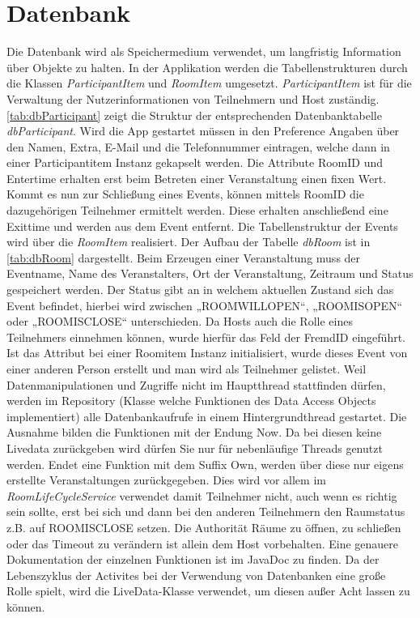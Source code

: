 \section{Datenbank}
\label{sec:Datenbank}
Die Datenbank wird als Speichermedium verwendet, um langfristig Information über Objekte zu halten. 
In der Applikation werden die Tabellenstrukturen durch die Klassen \textit{ParticipantItem} und \textit{RoomItem} umgesetzt. 
\textit{ParticipantItem} ist für die Verwaltung der Nutzerinformationen von Teilnehmern und Host zuständig.
 \cref{tab:dbParticipant} zeigt die Struktur der entsprechenden Datenbanktabelle \textit{dbParticipant}.
 Wird die App gestartet müssen in den Preference Angaben über den Namen, Extra, E-Mail und die Telefonnummer eintragen, welche dann in einer Participantitem Instanz gekapselt werden. 
Die Attribute RoomID und Entertime erhalten erst beim Betreten einer Veranstaltung einen fixen Wert. Kommt es nun zur Schließung eines Events, können mittels RoomID die dazugehörigen Teilnehmer ermittelt werden. 
Diese erhalten anschließend eine Exittime und werden aus dem Event entfernt.
Die Tabellenstruktur der Events wird über die \textit{RoomItem} realisiert. Der Aufbau der Tabelle \textit{dbRoom} ist in \cref{tab:dbRoom} dargestellt. 
Beim Erzeugen einer Veranstaltung muss der Eventname, Name des Veranstalters, Ort der Veranstaltung, Zeitraum und Status gespeichert werden. 
Der Status gibt an in welchem aktuellen Zustand sich das Event befindet, hierbei wird zwischen „ROOMWILLOPEN“, „ROOMISOPEN“ oder „ROOMISCLOSE“ unterschieden.
Da Hosts auch die Rolle eines Teilnehmers einnehmen können, wurde hierfür das Feld der FremdID eingeführt. 
Ist das Attribut bei einer Roomitem Instanz initialisiert, wurde dieses Event von einer anderen Person erstellt und man wird als Teilnehmer gelistet.
Weil Datenmanipulationen und Zugriffe nicht im Hauptthread stattfinden dürfen, werden im Repository (Klasse welche Funktionen des Data Access Objects implementiert) alle Datenbankaufrufe in einem Hintergrundthread gestartet.
Die Ausnahme bilden die Funktionen mit der Endung Now. 
Da bei diesen keine Livedata zurückgeben wird dürfen Sie nur für nebenläufige Threads genutzt werden. 
Endet eine Funktion mit dem Suffix Own, werden über diese nur eigens erstellte Veranstaltungen zurückgegeben.
Dies wird vor allem im \textit{RoomLifeCycleService} verwendet damit Teilnehmer nicht, auch wenn es richtig sein sollte, erst bei sich und dann bei den anderen Teilnehmern den Raumstatus z.B. auf ROOMISCLOSE setzen.
 Die Authorität Räume zu öffnen, zu schließen oder das Timeout zu verändern ist allein dem Host vorbehalten.
 Eine genauere Dokumentation der einzelnen Funktionen ist im JavaDoc zu finden.
Da der Lebenszyklus der Activites bei der Verwendung von Datenbanken eine große Rolle  spielt, wird die LiveData-Klasse verwendet, um diesen außer Acht lassen zu können. 

